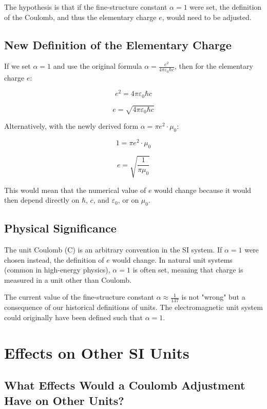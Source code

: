\documentclass{article}
\begin{document}
	The hypothesis is that if the fine-structure constant $\alpha = 1$ were set, the definition of the Coulomb, and thus the elementary charge $e$, would need to be adjusted.
	
	\subsection{New Definition of the Elementary Charge}
	
	If we set $\alpha = 1$ and use the original formula $\alpha = \frac{e^2}{4\pi\varepsilon_0\hbar c}$, then for the elementary charge $e$:
	
	$$e^2 = 4\pi\varepsilon_0\hbar c$$
	
	$$e = \sqrt{4\pi\varepsilon_0\hbar c}$$
	
	Alternatively, with the newly derived form $\alpha = \pi e^2 \cdot \mu_0$:
	
	$$1 = \pi e^2 \cdot \mu_0$$
	
	$$e = \sqrt{\frac{1}{\pi \mu_0}}$$
	
	This would mean that the numerical value of $e$ would change because it would then depend directly on $\hbar$, $c$, and $\varepsilon_0$, or on $\mu_0$.
	
	\subsection{Physical Significance}
	
	The unit Coulomb (C) is an arbitrary convention in the SI system. If $\alpha = 1$ were chosen instead, the definition of $e$ would change. In natural unit systems (common in high-energy physics), $\alpha = 1$ is often set, meaning that charge is measured in a unit other than Coulomb.
	
	The current value of the fine-structure constant $\alpha \approx \frac{1}{137}$ is not "wrong" but a consequence of our historical definitions of units. The electromagnetic unit system could originally have been defined such that $\alpha = 1$.
	
	\section{Effects on Other SI Units}
	
	\subsection{What Effects Would a Coulomb Adjustment Have on Other Units?}
	
\end{document}
